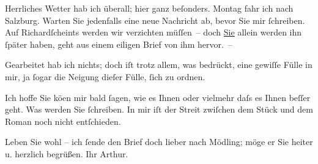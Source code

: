 \pstart
           Herrliches Wetter hab ich überall; hier ganz beſonders. Montag fahr ich
               nach Salzburg. Warten Sie {\pb}jedenfalls eine neue Nachricht ab, bevor Sie mir
               ſchreiben. Auf Richardſcheints werden wir verzichten müſſen – doch \uline{Sie}{ }\introOben{}allein\introOben{} werden ihn ſpäter haben, geht aus einem eiligen Brief
               von ihm hervor. –\pend
           
\pstart
           Gearbeitet hab ich nichts; doch iſt trotz allem, was bedrückt, eine gewiſſe Fülle in
               mir, ja ſogar die Neigung dieſer Fülle, ſich zu {\pb}ordnen.\pend
           
\pstart
           Ich hoffe Sie kö{\geminationn}en mir bald ſagen, wie es Ihnen \introOben{}oder vielmehr\introOben{} daſs es Ihnen beſſer geht. Was werden Sie
               ſchreiben. In mir iſt der Streit zwiſchen dem Stück und dem Roman noch nicht entſchieden.\pend
           
\pstart
           Leben Sie wohl – ich ſende den Brief doch lieber nach Mödling; möge er Sie heiter u. herzlich begrüßen.\pend
           \pstart Ihr \spacefill\mbox{Arthur.}\pend{}\endnumbering{}  
      
